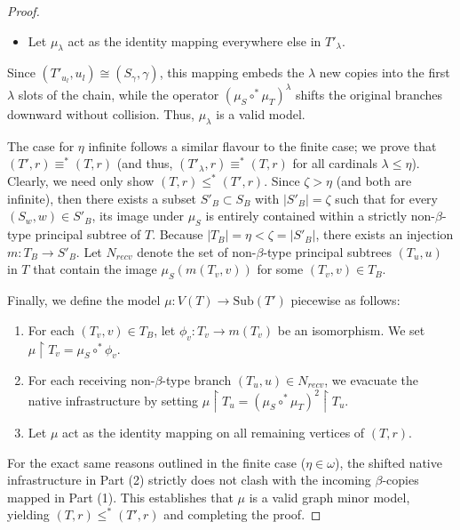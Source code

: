\documentclass[10pt,a4paper]{amsart}
\begin{document}
\begin{proof}
\begin{itemize}
\item Let $\mu_\lambda$ act as the identity mapping everywhere else in $T'_\lambda$.
\end{itemize}

\noindent
Since $(T'_{u_l}, u_l) \cong (S_\gamma, \gamma)$, this mapping embeds the $\lambda$ new copies into the first $\lambda$ slots of the chain, while the operator $(\mu_S \circ^* \mu_T)^\lambda$ shifts the original branches downward without collision. Thus, $\mu_\lambda$ is a valid model.


The case for $\eta$ infinite follows a similar flavour to the finite case; we prove that $(T', r) \equiv^* (T,r)$ (and thus, $(T'_\lambda, r) \equiv^* (T,r)$ for all cardinals $\lambda \leq \eta$). Clearly, we need only show $(T, r) \leq^* (T',r)$. Since $\zeta > \eta$ (and both are infinite), then there exists a subset $S'_B \subset S_B$ with $|S'_B| = \zeta$ such that for every $(S_w, w) \in S'_B$, its image under $\mu_S$ is entirely contained within a strictly non-$\beta$-type principal subtree of $T$. Because $|T_B| = \eta < \zeta = |S'_B|$, there exists an injection $m: T_B \to S'_B$. Let $N_{recv}$ denote the set of non-$\beta$-type principal subtrees $(T_u, u)$ in $T$ that contain the image $\mu_S(m(T_v, v))$ for some $(T_v, v) \in T_B$. 

Finally, we define the model $\mu: V(T) \to \text{Sub}(T')$ piecewise as follows:
\begin{enumerate}
\item For each $(T_v, v) \in T_B$, let $\phi_v: T_v \to m(T_v)$ be an isomorphism. We set $\mu \restriction T_v = \mu_S \circ^* \phi_v$.
\item For each receiving non-$\beta$-type branch $(T_u, u) \in N_{recv}$, we evacuate the native infrastructure by setting $\mu \restriction T_u = (\mu_S \circ^* \mu_T)^2 \restriction T_u$.
\item Let $\mu$ act as the identity mapping on all remaining vertices of $(T, r)$.
\end{enumerate}

For the exact same reasons outlined in the finite case ($\eta \in \omega$), the shifted native infrastructure in Part (2) strictly does not clash with the incoming $\beta$-copies mapped in Part (1). This establishes that $\mu$ is a valid graph minor model, yielding $(T, r) \leq^* (T', r)$ and completing the proof.

\end{proof}
\end{document}
